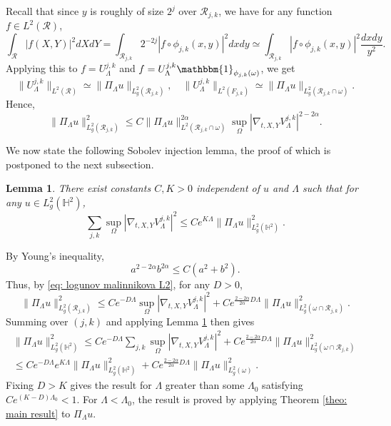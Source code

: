 \documentclass[letterpaper,11pt]{amsart}
\theoremstyle{note}
\newtheorem{lemma}[proposition]{Lemma}
\numberwithin{equation}{section}
\begin{document}
Recall that since $y$ is roughly of size $2^j$ over $\mathcal{R}_{j,k}$, we have for any function $f \in L^2(\mathcal{R})$, $$\int_\mathcal{R} |f(X, Y)|^2 dXdY = \int_{\mathcal{R}_{j,k}} 2^{-2j} |f \circ \phi_{j,k}(x,y)|^2 dxdy \simeq \int_{\mathcal{R}_{j,k}} |f \circ \phi_{j,k}(x,y)|^2 \frac{dxdy}{y^2}.$$ Applying this to $f = U_\Lambda^{j,k}$ and $f = U_\Lambda^{j,k} \mathbbm{1}_{\phi_{j,k}(\omega)}$, we get \begin{equation} \label{eq: density appears naturally}\|U_\Lambda^{j,k}\|_{L^2(\mathcal{R})} \simeq \|\Pi_\Lambda u\|_{L^2_g(\mathcal{R}_{j,k})}, \quad \|U_\Lambda^{j,k}\|_{L^2(F_{j,k})} \simeq \| \Pi_\Lambda u\|_{L^2_g(\mathcal{R}_{j,k} \cap \omega)}.\end{equation} Hence, \begin{equation}
    \label{eq: logunov malinnikova L2} \|\Pi_\Lambda u\|_{L^2_g(\mathcal{R}_{j,k})}^2 \leq C \|\Pi_\Lambda u\|_{L^2(\mathcal{R}_{j,k} \cap \omega)}^{2\alpha} \sup_{\Omega}|\nabla_{t,X,Y} V_\Lambda^{j,k}|^{2-2\alpha}.
\end{equation}

We now state the following Sobolev injection lemma, the proof of which is postponed to the next subsection.

\begin{lemma}
    \label{lemma: sobolev injection}
    There exist constants $C, K > 0$ independent of $u$ and $\Lambda$ such that for any $u \in L^2_g(\mathbb{H}^2)$, $$\sum_{j,k} \sup_\Omega|\nabla_{t,X,Y} V_\Lambda^{j,k}|^2 \leq C e^{K\Lambda} \|\Pi_\Lambda u\|_{L^2_g(\mathbb{H}^2)}^2.$$
\end{lemma}

By Young's inequality, $$a^{2-2\alpha} b^{2\alpha} \leq C(a^2 + b^2).$$ Thus, by \eqref{eq: logunov malinnikova L2}, for any $D > 0$, \begin{equation}
    \|\Pi_\Lambda u\|_{L^2_g(\mathcal{R}_{j,k})}^2 \leq C e^{-D\Lambda} \sup_\Omega |\nabla_{t,X,Y} V_\Lambda^{j,k}|^2 + C e^{\frac{2-2\alpha}{2\alpha} D\Lambda} \|\Pi_\Lambda u\|_{L^2_g(\omega \cap \mathcal{R}_{j,k})}^2.
\end{equation} Summing over $(j,k)$ and applying Lemma \ref{lemma: sobolev injection} then gives \begin{multline}
    \|\Pi_\Lambda u\|_{L^2_g(\mathbb{H}^2)}^2 \leq C e^{-D\Lambda} \sum_{j,k} \sup_{\Omega} |\nabla_{t,X,Y}V_\Lambda^{j,k}|^2 + C e^{\frac{2-2\alpha}{2\alpha}D\Lambda} \|\Pi_\Lambda u\|_{L^2_g(\omega \cap \mathcal{R}_{j,k})}^2 \\ \leq C e^{-D \Lambda} e^{K\Lambda} \|\Pi_\Lambda u\|_{L^2_g(\mathbb{H}^2)}^2 + C e^{\frac{2-2\alpha}{2\alpha} D\Lambda} \|\Pi_\Lambda u\|_{L^2_g(\omega)}^2.\end{multline} Fixing $D > K$ gives the result for $\Lambda$ greater than some $\Lambda_0$ satisfying $Ce^{(K-D)\Lambda_0} < 1$. For $\Lambda < \Lambda_0$, the result is proved by applying Theorem \ref{theo: main result} to $\Pi_\Lambda u$.
\end{document}

